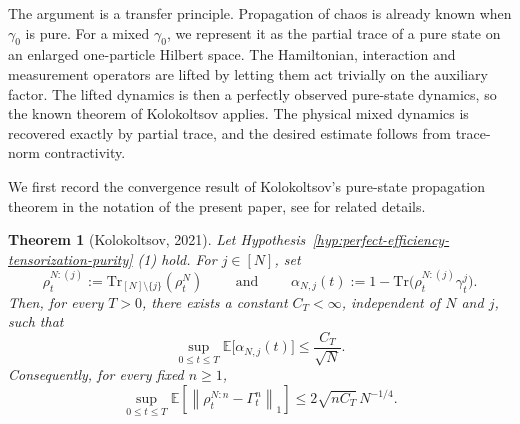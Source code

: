 \documentclass[10pt,a4paper,reqno]{amsart}
\numberwithin{equation}{section}
\theoremstyle{plain}
\newtheorem{theorem}{Theorem}[section]
\theoremstyle{definition}
\theoremstyle{remark}
\newcommand{\Tr}{\mathrm{Tr}}
\newcommand{\E}{\mathbb E}
\newcommand{\1}{\mathbf 1}
\begin{document}
The argument is a transfer principle.  Propagation of chaos is already known
when $\gamma_0$ is pure.  For a mixed $\gamma_0$, we represent it as the
partial trace of a pure state on an enlarged one-particle Hilbert space.  The
Hamiltonian, interaction and measurement operators are lifted by letting them
act trivially on the auxiliary factor.  The lifted dynamics is then a
perfectly observed pure-state dynamics, so the known theorem of Kolokoltsov \citep{kolokoltsov2021} applies.  The
physical mixed dynamics is recovered exactly by partial trace, and the desired
estimate follows from trace-norm contractivity.

We first record the convergence result of Kolokoltsov's pure-state
propagation theorem in the notation of the present paper,  see \citep{kolokoltsov2021} for related details.

\begin{theorem}[Kolokoltsov, 2021]
\label{thm:pure-input}
Let Hypothesis~\ref{hyp:perfect-efficiency-tensorization-purity} (1) hold.  
For $j\in[N]$, set
\begin{equation}
\rho_t^{N:(j)}
  :=
  \Tr_{[N]\setminus\{j\}}(\rho_t^N) \qquad \mbox{ and } \qquad  \alpha_{N,j}(t)
  :=
  1-\Tr\bigl(\rho_t^{N:(j)}\gamma_t^j\bigr).
  \label{eq:pure-counting-functional}
\end{equation}
Then, for every $T>0$, there exists a constant $C_T<\infty$, independent
of $N$ and $j$, such that
\begin{equation}
  \sup_{0\le t\le T}
  \E\bigl[\alpha_{N,j}(t)\bigr]
  \le
  \frac{C_T}{\sqrt N}.
  \label{eq:pure-counting-rate}
\end{equation}
Consequently, for every fixed $n\ge1$,
\begin{equation}
  \sup_{0\le t\le T}
  \E\left[
    \left\|
      \rho_t^{N:n}-\Gamma_t^n
    \right\|_1
  \right]
  \le
  2\sqrt{nC_T}\,N^{-1/4}.
  \label{eq:pure-trace-norm-rate}
\end{equation}
\end{theorem}
\end{document}
